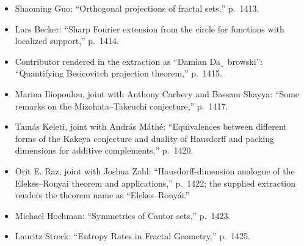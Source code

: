 \documentclass[11pt]{article}
\begin{document}
\begin{itemize}
\begin{itemize}
\item Shaoming Guo: ``Orthogonal projections of fractal sets,'' p.~1413.
\item Lars Becker: ``Sharp Fourier extension from the circle for functions with localized support,'' p.~1414.
\item Contributor rendered in the extraction as ``Damian Da˛ browski'': ``Quantifying Besicovitch projection theorem,'' p.~1415.
\item Marina Iliopoulou, joint with Anthony Carbery and Bassam Shayya: ``Some remarks on the Mizohata--Takeuchi conjecture,'' p.~1417.
\item Tamás Keleti, joint with András Máthé: ``Equivalences between different forms of the Kakeya conjecture and duality of Hausdorff and packing dimensions for additive complements,'' p.~1420.
\item Orit E. Raz, joint with Joshua Zahl: ``Hausdorff-dimension analogue of the Elekes--Ronyai theorem and applications,'' p.~1422; the supplied extraction renders the theorem name as ``Elekes--Ronyái.''
\item Michael Hochman: ``Symmetries of Cantor sets,'' p.~1423.
\item Lauritz Streck: ``Entropy Rates in Fractal Geometry,'' p.~1425.
\end{itemize}
\end{itemize}
\end{document}
